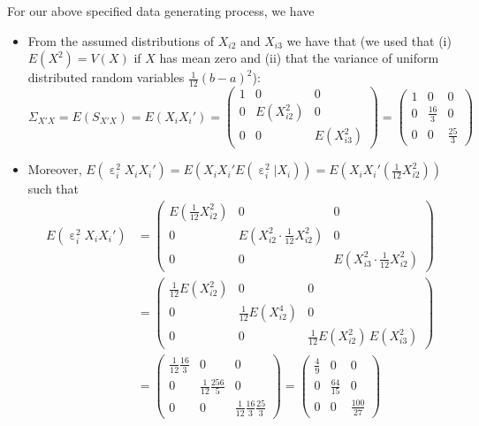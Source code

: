 \documentclass[
  14pt,
]{memoir}
\DeclareMathOperator{\eps}{\varepsilon}
\begin{document}
For our above specified data generating process, we have

\begin{itemize}
\item From the assumed distributions of $X_{i2}$ and $X_{i3}$ we have that (we used that (i) $E(X^2)=V(X)$ if $X$ has mean zero and (ii) that the variance of uniform distributed random variables $\frac{1}{12}(b-a)^2$):
$$\Sigma_{X'X}=E(S_{X'X})=E(X_iX_i')
=\left(\begin{matrix}1&0&0\\0&E(X_{i2}^2)&0\\0&0&E(X_{i3}^2)\end{matrix}\right)
=\left(\begin{matrix}1&0&0\\0&\frac{16}{3}&0\\0&0&\frac{25}{3}\end{matrix}\right)$$
\item Moreover, $E(\eps^2_iX_iX_i')=E(X_iX_i'E(\eps^2_i|X_i))=E\left(X_iX_i'\left(\frac{1}{12}X_{i2}^2\right)\right)$ such that
\begin{align*}
E(\eps^2_iX_iX_i')
&=\left(\begin{matrix}E\left(\frac{1}{12}X_{i2}^2\right)&0&0\\
                   0&E\left(X_{i2}^2\cdot\frac{1}{12}X_{i2}^2\right)&0\\0&0&E\left(X_{i3}^2\cdot\frac{1}{12}X_{i2}^2\right)
      \end{matrix}\right)\\
&=\left(\begin{matrix}\frac{1}{12}E\left(X_{i2}^2\right)&0&0\\
       0&\frac{1}{12}E\left(X_{i2}^4\right)&0\\0&0&\frac{1}{12}E\left(X_{i2}^2\right)\,E\left(X_{i3}^2\right)
\end{matrix}\right)\\      
&=\left(\begin{matrix}\frac{1}{12}\frac{16}{3}&0&0\\
                      0&\frac{1}{12}\frac{256}{5}&0\\
                      0&0&\frac{1}{12}\frac{16}{3}\frac{25}{3}\end{matrix}\right)
 =\left(\begin{matrix}\frac{4}{9}&0&0\\0&\frac{64}{15}&0\\0&0&\frac{100}{27}\end{matrix}\right)
\end{align*}
\end{itemize}
\end{document}
